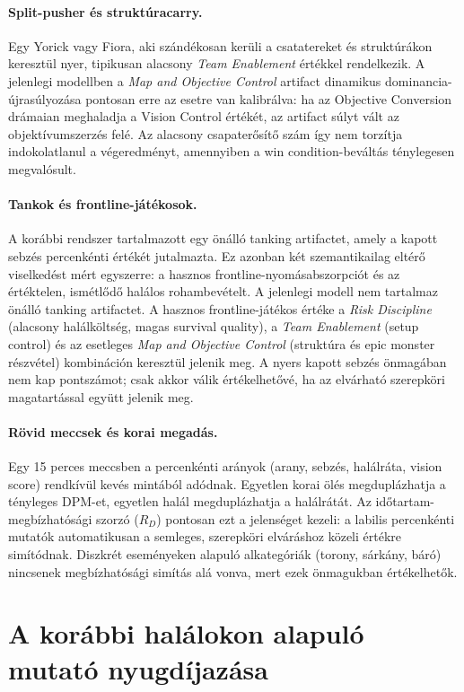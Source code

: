 \paragraph{Split-pusher és struktúracarry.}
Egy Yorick vagy Fiora, aki szándékosan kerüli a csatatereket és struktúrákon keresztül nyer, tipikusan alacsony \textit{Team Enablement} értékkel rendelkezik. A jelenlegi modellben a \textit{Map and Objective Control} artifact dinamikus dominancia-újrasúlyozása pontosan erre az esetre van kalibrálva: ha az Objective Conversion drámaian meghaladja a Vision Control értékét, az artifact súlyt vált az objektívumszerzés felé. Az alacsony csapaterősítő szám így nem torzítja indokolatlanul a végeredményt, amennyiben a win condition-beváltás ténylegesen megvalósult.

\paragraph{Tankok és frontline-játékosok.}
A korábbi rendszer tartalmazott egy önálló tanking artifactet, amely a kapott sebzés percenkénti értékét jutalmazta. Ez azonban két szemantikailag eltérő viselkedést mért egyszerre: a hasznos frontline-nyomásabszorpciót és az értéktelen, ismétlődő halálos rohambevételt. A jelenlegi modell nem tartalmaz önálló tanking artifactet. A hasznos frontline-játékos értéke a \textit{Risk Discipline} (alacsony halálköltség, magas survival quality), a \textit{Team Enablement} (setup control) és az esetleges \textit{Map and Objective Control} (struktúra és epic monster részvétel) kombináción keresztül jelenik meg. A nyers kapott sebzés önmagában nem kap pontszámot; csak akkor válik értékelhetővé, ha az elvárható szerepköri magatartással együtt jelenik meg.

\paragraph{Rövid meccsek és korai megadás.}
Egy 15 perces meccsben a percenkénti arányok (arany, sebzés, halálráta, vision score) rendkívül kevés mintából adódnak. Egyetlen korai ölés megduplázhatja a tényleges DPM-et, egyetlen halál megduplázhatja a halálrátát. Az időtartam-megbízhatósági szorzó ($R_D$) pontosan ezt a jelenséget kezeli: a labilis percenkénti mutatók automatikusan a semleges, szerepköri elváráshoz közeli értékre simítódnak. Diszkrét eseményeken alapuló alkategóriák (torony, sárkány, báró) nincsenek megbízhatósági simítás alá vonva, mert ezek önmagukban értékelhetők.

\section{A korábbi halálokon alapuló mutató nyugdíjazása}

